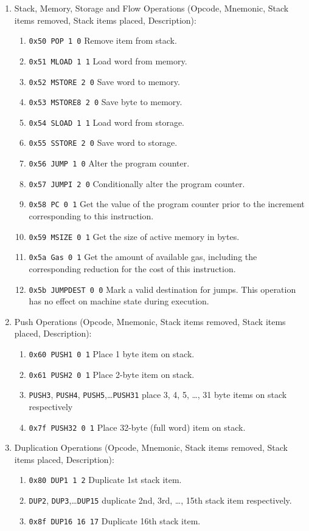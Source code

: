 \begin{enumerate}
\item Stack, Memory, Storage and Flow Operations (Opcode, Mnemonic, Stack items removed, Stack items placed, Description):
\begin{enumerate}
\item\verb|0x50 POP 1 0| Remove item from stack.
\item\verb|0x51 MLOAD 1 1| Load word from memory.
\item\verb|0x52 MSTORE 2 0| Save word to memory.
\item\verb|0x53 MSTORE8 2 0| Save byte to memory.
\item\verb|0x54 SLOAD 1 1| Load word from storage.
\item\verb|0x55 SSTORE 2 0| Save word to storage.
\item\verb|0x56 JUMP 1 0| Alter the program counter.
\item\verb|0x57 JUMPI 2 0| Conditionally alter the program counter.
\item\verb|0x58 PC 0 1| Get the value of the program counter prior to the increment corresponding to this instruction.
\item\verb|0x59 MSIZE 0 1| Get the size of active memory in bytes.
\item\verb|0x5a Gas 0 1| Get the amount of available gas, including the corresponding reduction for the cost of this instruction.
\item\verb|0x5b JUMPDEST 0 0| Mark a valid destination for jumps. This operation has no effect on machine state during execution.
\end{enumerate}

\item Push Operations (Opcode, Mnemonic, Stack items removed, Stack items placed, Description):
\begin{enumerate}
\item\verb|0x60 PUSH1 0 1| Place 1 byte item on stack.
\item\verb|0x61 PUSH2 0 1| Place 2-byte item on stack.
\item\verb|PUSH3|, \verb|PUSH4|, \verb|PUSH5|,\dots \verb|PUSH31| place 3, 4, 5, \dots , 31 byte items on stack respectively
\item\verb|0x7f PUSH32 0 1| Place 32-byte (full word) item on stack.
\end{enumerate}

\item Duplication Operations (Opcode, Mnemonic, Stack items removed, Stack items placed, Description):
\begin{enumerate}
\item\verb|0x80 DUP1 1 2| Duplicate 1st stack item.
\item\verb|DUP2|, \verb|DUP3|,\dots \verb|DUP15| duplicate 2nd, 3rd, \dots , 15th stack item respectively.
\item\verb|0x8f DUP16 16 17| Duplicate 16th stack item.
\end{enumerate}


\end{enumerate}
